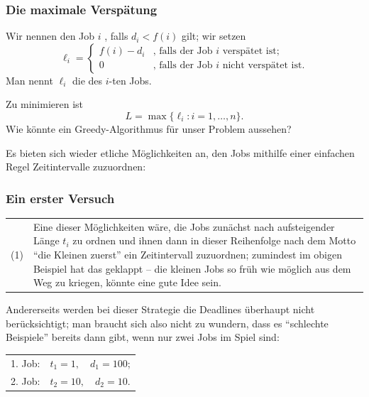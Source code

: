 \documentclass[smaller]{beamer}
\begin{document}
\begin{frame}
 \frametitle{Die maximale Verspätung}
 Wir nennen den Job $i$ , falls $d_i < f(i)$ gilt; wir setzen
\[
\ell_i = 
\begin{cases}
f(i) - d_i & \text{, falls der Job  $i$ verspätet ist}; \\
0 & \text{, falls der Job $i$ nicht verspätet ist}.
\end{cases}
\]
Man nennt $\ell_i$ die  des $i$-ten Jobs. \\ \vspace*{0.2cm}

Zu minimieren ist
\[
L = \max{\big\{ \ell_i : i = 1,\ldots,n \big\}}.
\]
Wie könnte ein Greedy-Algorithmus für unser Problem aussehen? \\ \vspace*{0.2cm}

Es bieten sich wieder etliche Möglichkeiten an, den Jobs mithilfe einer einfachen Regel Zeitintervalle zuzuordnen:
\end{frame}

\begin{frame}
\frametitle{Ein erster Versuch}
\begin{tabular}{p{0.5cm}p{10cm}} 
(1) & Eine dieser Möglichkeiten wäre, \alert{die Jobs zunächst nach aufsteigender Länge $t_i$ zu ordnen und ihnen dann in dieser Reihenfolge nach dem Motto \enquote{die Kleinen zuerst} ein Zeitintervall zuzuordnen}; zumindest im obigen Beispiel hat das geklappt -- die kleinen Jobs so früh wie möglich aus dem Weg zu kriegen, könnte eine gute Idee sein.
\end{tabular}
\medskip

Andererseits werden bei dieser Strategie die Deadlines überhaupt nicht berücksichtigt; man braucht sich also nicht zu wundern, dass es \enquote{schlechte Beispiele} bereits dann gibt, wenn nur zwei Jobs im Spiel sind:

\begin{center}
\begin{tabular}{rl}
1. Job: & $t_1=1,\quad d_1=100$; \\
2. Job: & $t_2=10, \quad d_2=10$.
\end{tabular}
\end{center}
\end{frame}
\end{document}
